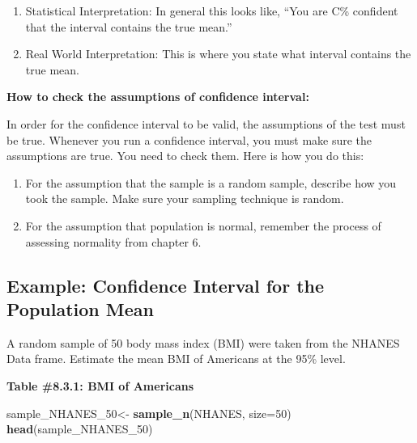 \documentclass[
]{book}
\newenvironment{Shaded}{\begin{snugshade}}{\end{snugshade}}
\newcommand{\DataTypeTok}[1]{\textcolor[rgb]{0.13,0.29,0.53}{#1}}
\newcommand{\DecValTok}[1]{\textcolor[rgb]{0.00,0.00,0.81}{#1}}
\newcommand{\KeywordTok}[1]{\textcolor[rgb]{0.13,0.29,0.53}{\textbf{#1}}}
\newcommand{\NormalTok}[1]{#1}
\newcommand{\StringTok}[1]{\textcolor[rgb]{0.31,0.60,0.02}{#1}}
\begin{document}
\begin{enumerate}
\def\labelenumi{\arabic{enumi}.}
\setcounter{enumi}{3}
\item
  Statistical Interpretation: In general this looks like, ``You are C\% confident that the interval contains the true mean.''
\item
  Real World Interpretation: This is where you state what interval contains the true mean.
\end{enumerate}

\textbf{How to check the assumptions of confidence interval:}

In order for the confidence interval to be valid, the assumptions of the test must be true. Whenever you run a confidence interval, you must make sure the assumptions are true. You need to check them. Here is how you do this:

\begin{enumerate}
\def\labelenumi{\arabic{enumi}.}
\item
  For the assumption that the sample is a random sample, describe how you took the sample. Make sure your sampling technique is random.
\item
  For the assumption that population is normal, remember the process of assessing normality from chapter 6.
\end{enumerate}

\hypertarget{example-confidence-interval-for-the-population-mean}{%
\subsection{Example: Confidence Interval for the Population Mean}\label{example-confidence-interval-for-the-population-mean}}

A random sample of 50 body mass index (BMI) were taken from the NHANES Data frame. Estimate the mean BMI of Americans at the 95\% level.

\textbf{Table \#8.3.1: BMI of Americans}

\begin{Shaded}
\begin{Highlighting}[]
\NormalTok{sample_NHANES_}\DecValTok{50}\NormalTok{<-}
\StringTok{  }\KeywordTok{sample_n}\NormalTok{(NHANES, }\DataTypeTok{size=}\DecValTok{50}\NormalTok{)}
\KeywordTok{head}\NormalTok{(sample_NHANES_}\DecValTok{50}\NormalTok{)}
\end{Highlighting}
\end{Shaded}
\end{document}
